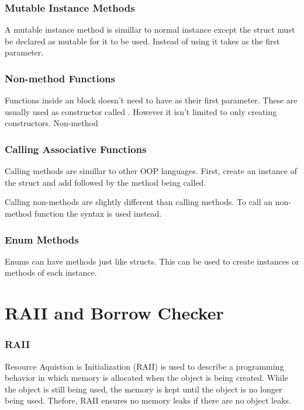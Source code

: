 \documentclass{beamer}
\begin{document}
\begin{frame}
  \frametitle{Mutable Instance Methods}
  A mutable instance method is simillar to normal instance except the struct must be declared as mutable for it to be used. Instead of using  it takes  as the first parameter.
  
\end{frame}

\begin{frame}
  \frametitle{Non-method Functions}
  Functions inside an  block doesn't need to have  as their first parameter. These are usually used as constructor called . However it isn't limited to only creating constructors. Non-method
  
\end{frame}

\begin{frame}[allowframebreaks]
  \frametitle{Calling Associative Functions}
  Calling methods are simillar to other OOP languages. First, create an instance of the struct and add  followed by the method being called.
  

  \pagebreak

  Calling non-methods are slightly different than calling methods. To call an non-method function the \inlinecode{::} syntax is used instead.
  
\end{frame}

\begin{frame}[fragile]
  \frametitle{Enum Methods}
  Enums can have methods just like structs. This can be used to create instances or methods of each instance.

  
\end{frame}

\section{RAII and Borrow Checker}
\begin{frame}
  \frametitle{RAII}
  Resource Aquistion is Initialization (RAII) is used to describe a programming behavior in which memory is allocated when the object is being created. While the object is still being used, the memory is kept until the object is no longer being used. Thefore, RAII ensures no memory leaks if there are no object leaks.
\end{frame}
\end{document}
